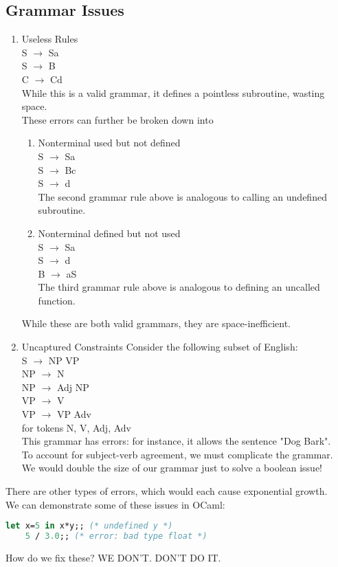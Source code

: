 \documentclass[../../lecture_notes.tex]{subfiles}
\begin{document}
\subsection*{Grammar Issues}
\begin{enumerate} [itemsep=0mm]
	\item {Useless Rules}\\
		S $\rightarrow$ Sa\\
		S $\rightarrow$ B\\
		C $\rightarrow$ Cd\\
		While this is a valid grammar, it defines a pointless subroutine, wasting space.\\
		These errors can further be broken down into 
			\begin{enumerate} [itemsep=0mm]
				\item Nonterminal used but not defined\\
						S $\rightarrow$ Sa\\
						S $\rightarrow$ Bc\\
						S $\rightarrow$ d\\
					The second grammar rule above is analogous to calling an undefined subroutine.
				\item Nonterminal defined but not used\\
						S $\rightarrow$ Sa\\
						S $\rightarrow$ d\\
						B $\rightarrow$ aS\\
					The third grammar rule above is analogous to defining an uncalled function.
			\end{enumerate}
		While these are both valid grammars, they are space-inefficient.
	\item Uncaptured Constraints
		Consider the following subset of English:\\
			S $\rightarrow$ NP VP\\
			NP $\rightarrow$ N\\
			NP $\rightarrow$ Adj NP\\
			VP $\rightarrow$ V\\
			VP $\rightarrow$ VP Adv\\
			for tokens {N, V, Adj, Adv}\\
		This grammar has errors: for instance, it allows the sentence "Dog Bark".\\
		To account for subject-verb agreement, we must complicate the grammar.\\
		We would double the size of our grammar just to solve a boolean issue!\\
	\end{enumerate}
There are other types of errors, which would each cause exponential growth.\\
We can demonstrate some of these issues in OCaml:\\
\begin{lstlisting}[language=ML]
	let x=5 in x*y;; (* undefined y *)
	5 / 3.0;; (* error: bad type float *)
\end{lstlisting}
How do we fix these? WE DON'T.  DON'T DO IT.\\
\end{document}
